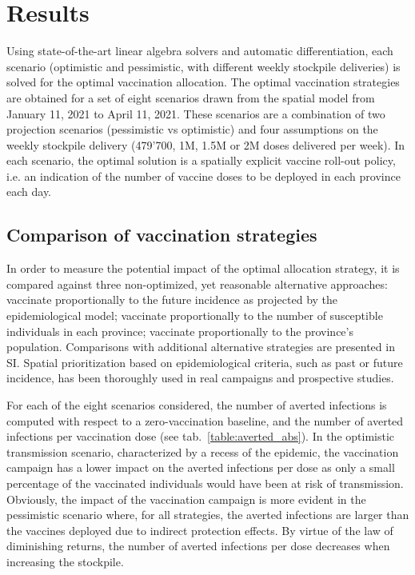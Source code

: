 \section{Results}
Using state-of-the-art linear algebra solvers and automatic differentiation, each scenario (optimistic and pessimistic, with different weekly stockpile deliveries) is solved for the optimal vaccination allocation. The optimal vaccination strategies are obtained for a set of eight scenarios drawn from the spatial model from January 11, 2021 to April 11, 2021. These scenarios are a combination of two projection scenarios (pessimistic vs optimistic) and four assumptions on the weekly stockpile delivery (479'700, 1M, 1.5M or 2M doses delivered per week). In each scenario, the optimal solution is a spatially explicit vaccine roll-out policy, i.e. an indication of the number of vaccine doses to be deployed in each province each day. 
\subsection*{Comparison of vaccination strategies}
In order to measure the potential impact of the optimal allocation strategy, it is compared against three non-optimized, yet reasonable alternative approaches: vaccinate proportionally to the future incidence as projected by the epidemiological model; vaccinate proportionally to the number of susceptible individuals in each province; vaccinate proportionally to the province's population. 
Comparisons with additional alternative strategies are presented in SI. Spatial prioritization based on epidemiological criteria, such as past\cite{Lee:AchievingCoordinatedNational:2020} or future\cite{Pasetto:RealtimeForecastingCholera:2018} incidence, has been thoroughly used in real campaigns and prospective studies.

For each of the eight scenarios considered, the number of averted infections is computed with respect to a zero-vaccination baseline, and the number of averted infections per vaccination dose (see tab.~\ref{table:averted_abs}). In the optimistic transmission scenario, characterized by a recess of the epidemic, the vaccination campaign has a lower impact on the averted infections per dose as only a small percentage of the vaccinated individuals would have been at risk of transmission. Obviously, the impact of the vaccination campaign is more evident in the pessimistic scenario where, for all strategies, the averted infections are larger than the vaccines deployed due to indirect protection effects. By virtue of the law of diminishing returns, the number of averted infections per dose decreases when increasing the stockpile. 

